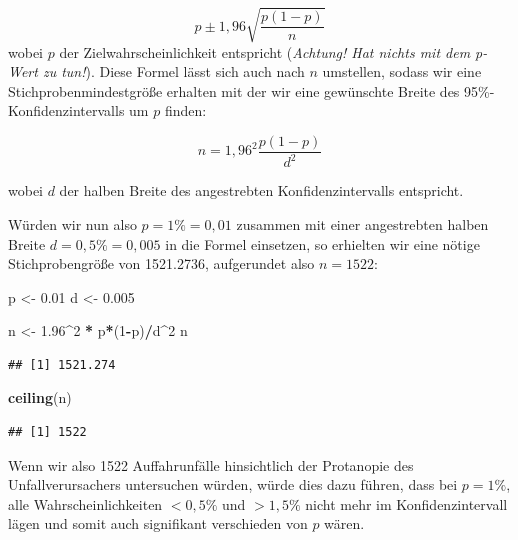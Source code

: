 \documentclass[
]{article}
\newenvironment{Shaded}{\begin{snugshade}}{\end{snugshade}}
\newcommand{\DecValTok}[1]{\textcolor[rgb]{0.00,0.00,0.81}{#1}}
\newcommand{\FloatTok}[1]{\textcolor[rgb]{0.00,0.00,0.81}{#1}}
\newcommand{\KeywordTok}[1]{\textcolor[rgb]{0.13,0.29,0.53}{\textbf{#1}}}
\newcommand{\NormalTok}[1]{#1}
\newcommand{\OperatorTok}[1]{\textcolor[rgb]{0.81,0.36,0.00}{\textbf{#1}}}
\newcommand{\StringTok}[1]{\textcolor[rgb]{0.31,0.60,0.02}{#1}}
\begin{document}
\[ p ± 1,96 \sqrt{\frac{p(1-p)}{n}}\] wobei \(p\) der
Zielwahrscheinlichkeit entspricht (\emph{Achtung! Hat nichts mit dem
p-Wert zu tun!}). Diese Formel lässt sich auch nach \(n\) umstellen,
sodass wir eine Stichprobenmindestgröße erhalten mit der wir eine
gewünschte Breite des 95\%-Konfidenzintervalls um \(p\) finden:

\[ n = 1,96^2 \frac{p(1-p)}{d^2} \]

wobei \(d\) der halben Breite des angestrebten Konfidenzintervalls
entspricht.

Würden wir nun also \(p=1\%=0,01\) zusammen mit einer angestrebten
halben Breite \(d=0,5\%=0,005\) in die Formel einsetzen, so erhielten
wir eine nötige Stichprobengröße von 1521.2736, aufgerundet also
\(n=1522\):

\begin{Shaded}
\begin{Highlighting}[]
\NormalTok{p <-}\StringTok{ }\FloatTok{0.01}
\NormalTok{d <-}\StringTok{ }\FloatTok{0.005}
\end{Highlighting}
\end{Shaded}

\begin{Shaded}
\begin{Highlighting}[]
\NormalTok{n <-}\StringTok{ }\FloatTok{1.96}\OperatorTok{^}\DecValTok{2} \OperatorTok{*}\StringTok{ }\NormalTok{p}\OperatorTok{*}\NormalTok{(}\DecValTok{1}\OperatorTok{-}\NormalTok{p)}\OperatorTok{/}\NormalTok{d}\OperatorTok{^}\DecValTok{2}
\NormalTok{n}
\end{Highlighting}
\end{Shaded}

\begin{verbatim}
## [1] 1521.274
\end{verbatim}

\begin{Shaded}
\begin{Highlighting}[]
\KeywordTok{ceiling}\NormalTok{(n)}
\end{Highlighting}
\end{Shaded}

\begin{verbatim}
## [1] 1522
\end{verbatim}

Wenn wir also 1522 Auffahrunfälle hinsichtlich der Protanopie des
Unfallverursachers untersuchen würden, würde dies dazu führen, dass bei
\(p=1\%\), alle Wahrscheinlichkeiten \(<0,5\%\) und \(>1,5\%\) nicht
mehr im Konfidenzintervall lägen und somit auch signifikant verschieden
von \(p\) wären.
\end{document}
